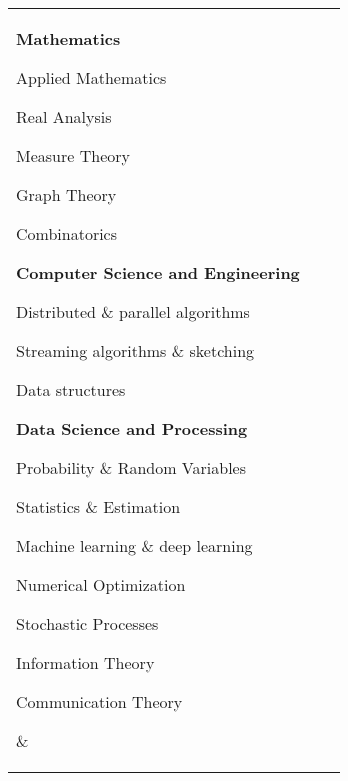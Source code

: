 \begin{tabular}[t]{@{}p{\textwidth-\rcollength-3.5\spacewidth}@{}p{\spacewidth}@{}p{\rcollength}}%

\parbox{1.5\rcollength}{%
\textbf{Mathematics}
\begin{innerlist}
	\item[] Applied Mathematics
	\item[] Real Analysis
	\item[] Measure Theory
	\item[] Graph Theory
	\item[] Combinatorics
\end{innerlist}
%
\textbf{Computer Science and Engineering}
\begin{innerlist}
	\item[] Distributed \& parallel algorithms
	\item[] Streaming algorithms \& sketching
	\item[] Data structures
\end{innerlist}
\textbf{Data Science and Processing}
%
\begin{innerlist}
    \item[] Probability \& Random Variables
    \item[] Statistics \& Estimation
	\item[] Machine learning \& deep learning
	\item[] Numerical Optimization
    \item[] Stochastic Processes
    \item[] Information Theory
    \item[] Communication Theory
\end{innerlist}
}

&


\end{tabular}
